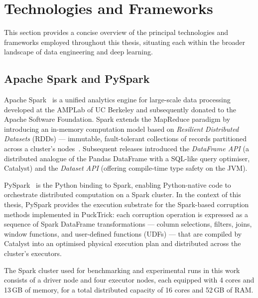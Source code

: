 \section{Technologies and Frameworks}
\label{sec:technologies}

This section provides a concise overview of the principal technologies and
frameworks employed throughout this thesis, situating each within the broader
landscape of data engineering and deep learning.

\subsection{Apache Spark and PySpark}
\label{sec:tech-spark}

Apache Spark~\cite{zaharia2016apache} is a unified analytics engine for
large-scale data processing developed at the AMPLab of UC
Berkeley and subsequently donated to the Apache Software Foundation.  Spark
extends the MapReduce paradigm by introducing an in-memory computation
model based on \emph{Resilient Distributed Datasets} (RDDs) — immutable,
fault-tolerant collections of records partitioned across a cluster's
nodes~\cite{zaharia2012resilient}.  Subsequent releases introduced the
\emph{DataFrame API} (a distributed analogue of the Pandas DataFrame with a
SQL-like query optimiser, Catalyst) and the \emph{Dataset API} (offering
compile-time type safety on the JVM).

PySpark~\cite{spark2024pyspark} is the Python binding to Spark, enabling
Python-native code to orchestrate distributed computation on a Spark cluster.
In the context of this thesis, PySpark provides the execution substrate for the
Spark-based corruption methods implemented in PuckTrick: each corruption
operation is expressed as a sequence of Spark DataFrame transformations —
column selections, filters, joins, window functions, and user-defined functions
(UDFs) — that are compiled by Catalyst into an optimised physical execution plan
and distributed across the cluster's executors.

The Spark cluster used for benchmarking and experimental runs in this work
consists of a driver node and four executor nodes, each equipped with 4 cores
and 13\,GB of memory, for a total distributed capacity of 16 cores and 52\,GB
of RAM.

